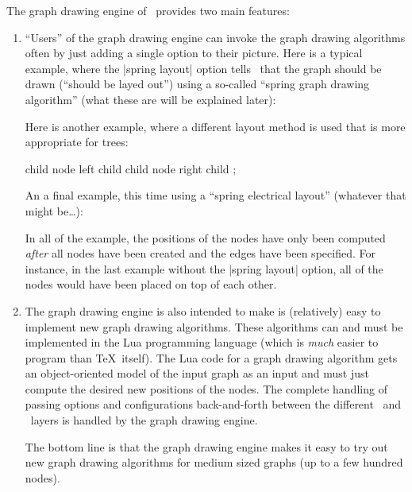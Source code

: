 The graph drawing engine of \tikzname\ provides two main features:
\begin{enumerate}
\item ``Users'' of the graph drawing engine can invoke the graph
  drawing algorithms often by just adding a single option to their
  picture. Here is a typical example, where the |spring layout| option
  tells \tikzname\ that the graph should be drawn (``should be layed
  out'') using a so-called ``spring graph drawing algorithm'' (what
  these are will be explained later):
\begin{codeexample}[]
\end{codeexample}
  Here is another example, where a different layout method is used
  that is more appropriate for trees:
\begin{codeexample}[]
\tikz [grow'=up, tree layout]
  child { node {left child} }
  child { node {right child} };
\end{codeexample}
  An a final example, this time using a ``spring electrical layout''
  (whatever that might be\dots):
\begin{codeexample}[]
\end{codeexample}
  In all of the example, the positions of the nodes have only been
  computed \emph{after} all nodes have been created and the edges have
  been specified. For instance, in the last example without the
  |spring layout| option, all of the nodes would have been placed on
  top of each other.
\item The graph drawing engine is also intended to make is
  (relatively) easy to implement new graph drawing algorithms. These
  algorithms can and must be implemented in the Lua programming
  language (which is \emph{much} easier to program than \TeX\
  itself). The Lua code for a graph drawing algorithm gets an
  object-oriented model of the input graph as an input and must just
  compute the desired new positions of the nodes. The complete
  handling of passing options and configurations back-and-forth
  between the different \tikzname\ and \pgfname\ layers is handled by
  the graph drawing engine.

  The bottom line is that the graph drawing engine makes it easy
  to try out new graph drawing algorithms for medium sized graphs (up
  to a few hundred nodes).
\end{enumerate}

